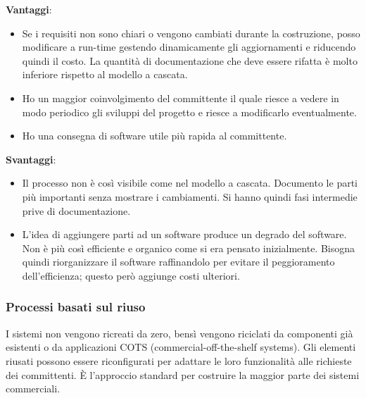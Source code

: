 \documentclass[a4paper, 10pt]{article}
\begin{document}
			\noindent
			\textbf{Vantaggi}:
			\begin{itemize}
				\item Se i requisiti non sono chiari o vengono cambiati durante la costruzione, posso modificare a run-time gestendo dinamicamente gli aggiornamenti e riducendo quindi il costo.
				La quantità di documentazione che deve essere rifatta è molto inferiore rispetto al modello a cascata.
				
				\item Ho un maggior coinvolgimento del committente il quale riesce a vedere in modo periodico gli sviluppi del progetto e riesce a modificarlo eventualmente.
				
				\item Ho una consegna di software utile più rapida al committente.
			\end{itemize}
			
			\noindent
			\textbf{Svantaggi}:
			\begin{itemize}
				\item Il processo non è così visibile come nel modello a cascata. Documento le parti più importanti senza mostrare i cambiamenti. Si hanno quindi fasi intermedie prive di documentazione.
				
				\item L'idea di aggiungere parti ad un software produce un degrado del software. Non è più così efficiente e organico come si era pensato inizialmente. Bisogna quindi riorganizzare il software raffinandolo per evitare il peggioramento dell'efficienza; questo però aggiunge costi ulteriori.
			\end{itemize}
			
			\subsubsection{Processi basati sul riuso}
			I sistemi non vengono ricreati da zero, bensì vengono riciclati da componenti già esistenti o da applicazioni COTS (commercial-off-the-shelf systems). Gli elementi riusati possono essere riconfigurati per adattare le loro funzionalità alle richieste dei committenti.
			È l'approccio standard per costruire la maggior parte dei sistemi commerciali.
			
\end{document}
